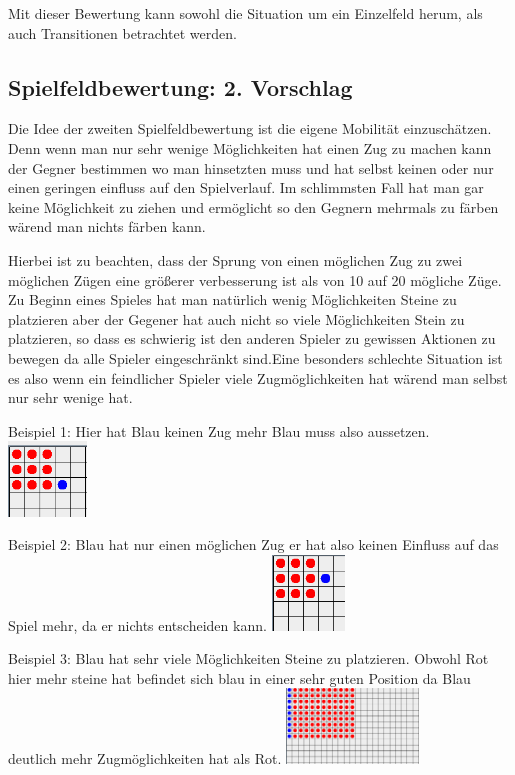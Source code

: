 \documentclass[12pt,a4paper,bibliography=totocnumbered,listof=totocnumbered]{scrartcl}
\begin{document}
Mit dieser Bewertung kann sowohl die Situation um ein Einzelfeld herum, als auch Transitionen betrachtet werden. 

\subsection{Spielfeldbewertung: 2. Vorschlag}
Die Idee der zweiten Spielfeldbewertung ist die eigene Mobilität einzuschätzen. Denn wenn man nur sehr wenige Möglichkeiten hat einen Zug zu machen kann der Gegner bestimmen wo man hinsetzten muss und hat selbst keinen oder nur einen geringen einfluss auf den Spielverlauf. Im schlimmsten Fall hat man gar keine Möglichkeit zu ziehen und ermöglicht so den Gegnern mehrmals zu färben wärend man nichts färben kann.

Hierbei ist zu beachten, dass der Sprung von einen möglichen Zug zu zwei möglichen Zügen eine größerer verbesserung ist als von 10 auf 20 mögliche Züge.
Zu Beginn eines Spieles hat man natürlich wenig Möglichkeiten Steine zu platzieren aber der Gegener hat auch nicht so viele Möglichkeiten Stein zu platzieren, so dass es schwierig ist den anderen Spieler zu gewissen Aktionen zu bewegen da alle Spieler eingeschränkt sind.Eine besonders schlechte Situation ist es also wenn ein feindlicher Spieler viele Zugmöglichkeiten hat wärend man selbst nur sehr wenige hat.

Beispiel 1: Hier hat Blau keinen Zug mehr Blau muss also aussetzen.
\newline
\includegraphics[height=2cm]{pics/BlauKeinZug}

Beispiel 2: Blau hat nur einen möglichen Zug er hat also keinen Einfluss auf das Spiel mehr, da er nichts entscheiden kann.
\newline
\includegraphics[height=2cm]{pics/BlauEinZug}

Beispiel 3: Blau hat sehr viele Möglichkeiten Steine zu platzieren. Obwohl Rot hier mehr steine hat befindet sich blau in einer sehr guten Position da Blau deutlich mehr Zugmöglichkeiten hat als Rot.
\newline
\includegraphics[height=2cm]{pics/BlauVieleZuege}
 
\end{document}
